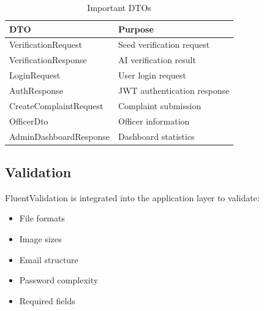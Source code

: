 \begin{table}[H]
\centering
\caption{Important DTOs}
\label{tab:important-dtos}
\renewcommand{\arraystretch}{1.3}

\begin{tabularx}{0.95\textwidth}{|p{4cm}|X|}
\hline
\textbf{DTO} & \textbf{Purpose} \\
\hline

VerificationRequest & Seed verification request \\

\hline

VerificationResponse & AI verification result \\

\hline

LoginRequest & User login request \\

\hline

AuthResponse & JWT authentication response \\

\hline

CreateComplaintRequest & Complaint submission \\

\hline

OfficerDto & Officer information \\

\hline

AdminDashboardResponse & Dashboard statistics \\

\hline

\end{tabularx}

\end{table}

\subsection{Validation}

FluentValidation is integrated into the application layer to validate:

\begin{itemize}
    \item File formats
    \item Image sizes
    \item Email structure
    \item Password complexity
    \item Required fields
\end{itemize}

